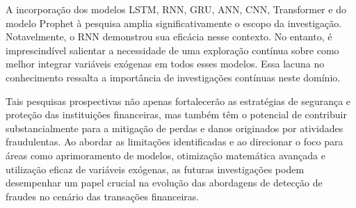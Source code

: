 A incorporação dos modelos LSTM, RNN, GRU, ANN, CNN, Transformer e do modelo Prophet à pesquisa amplia significativamente o escopo da investigação. Notavelmente, o RNN demonstrou sua eficácia nesse contexto. No entanto, é imprescindível salientar a necessidade de uma exploração contínua sobre como melhor integrar variáveis exógenas em todos esses modelos. Essa lacuna no conhecimento ressalta a importância de investigações contínuas neste domínio.

Tais pesquisas prospectivas não apenas fortalecerão as estratégias de segurança e proteção das instituições financeiras, mas também têm o potencial de contribuir substancialmente para a mitigação de perdas e danos originados por atividades fraudulentas. Ao abordar as limitações identificadas e ao direcionar o foco para áreas como aprimoramento de modelos, otimização matemática avançada e utilização eficaz de variáveis exógenas, as futuras investigações podem desempenhar um papel crucial na evolução das abordagens de detecção de fraudes no cenário das transações financeiras.